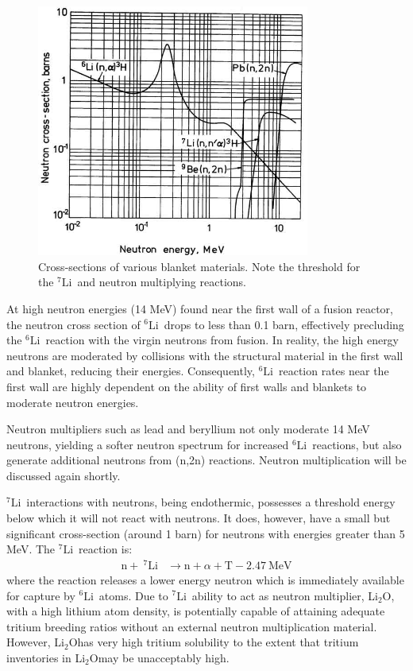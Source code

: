 \documentclass[11pt]{report} %
\newcommand{\lio}{Li$_2$O}
\newcommand{\lisev}{$^7\mathrm{Li}$}
\newcommand{\lisix}{$^6\mathrm{Li}$}
\begin{document}
\begin{figure}
\centering
\includegraphics[width=0.8\textwidth]{../images/breeding_xsecs} 
\caption{Cross-sections of various blanket materials. Note the threshold for the \lisev~and neutron multiplying reactions.}
\label{fig:xsects}
\end{figure}

At high neutron energies (14 MeV) found near the first wall of a fusion reactor, the neutron cross section of \lisix~drops to less than 0.1 barn, effectively precluding the \lisix~reaction with the virgin neutrons from fusion. In reality, the high energy neutrons are moderated by collisions with the structural material in the first wall and blanket, reducing their energies. Consequently, \lisix~reaction rates near the first wall are highly dependent on the ability of first walls and blankets to moderate neutron energies.

Neutron multipliers such as lead and beryllium not only moderate 14 MeV neutrons, yielding a softer neutron spectrum for increased \lisix~reactions, but also generate additional neutrons from (n,2n) reactions. Neutron multiplication will be discussed again shortly.

\lisev~interactions with neutrons, being endothermic, possesses a threshold energy below which it will not react with neutrons. It does, however, have a small but significant cross-section (around 1 barn) for neutrons with energies greater than 5 MeV. The \lisev~reaction is:
\begin{align}
\mathrm{n} + ~^7\mathrm{Li} &\xrightarrow ~\mathrm{n}+\alpha + \mathrm{T} -2.47~\text{MeV}\label{eq:Li7T}
\end{align}
where the reaction releases a lower energy neutron which is immediately available for capture by \lisix~atoms. Due to \lisev~ability to act as neutron multiplier, \lio, with a high lithium atom density, is potentially capable of attaining adequate tritium breeding ratios without an external neutron multiplication material. However, \lio has very high tritium solubility to the extent that tritium inventories in \lio may be unacceptably high.
\end{document}
